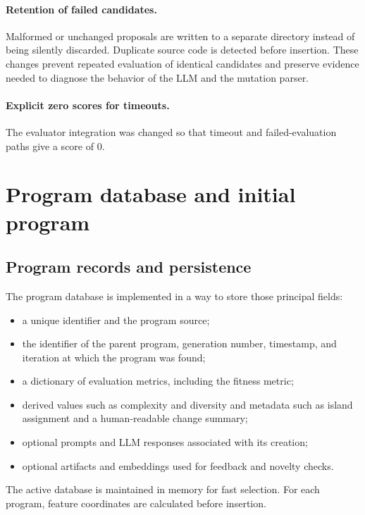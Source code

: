 \paragraph{Retention of failed candidates.}
Malformed or unchanged proposals are written to a separate
directory instead of being silently discarded.
Duplicate source code is detected before insertion.
These changes prevent repeated evaluation of identical candidates and preserve
evidence needed to diagnose the behavior of the LLM and the mutation parser.

\paragraph{Explicit zero scores for timeouts.}
The evaluator integration was changed so that timeout and failed-evaluation
paths give a score of 0.

\section{Program database and initial program}
\label{sec:program-database}

\subsection{Program records and persistence}

The program database is implemented in a way to store those principal fields:

\begin{itemize}
  \item a unique identifier and the program source;
  \item the identifier of the parent program, generation number, timestamp, and
  iteration at which the program was found;
  \item a dictionary of evaluation metrics, including the fitness metric;
  \item derived values such as complexity and diversity and metadata such as
  island assignment and a human-readable change summary;
  \item optional prompts and LLM responses associated with its creation;
  \item optional artifacts and embeddings used for feedback and novelty
  checks.
\end{itemize}

The active database is maintained in memory for fast selection.
For each program, feature coordinates are calculated before insertion.

